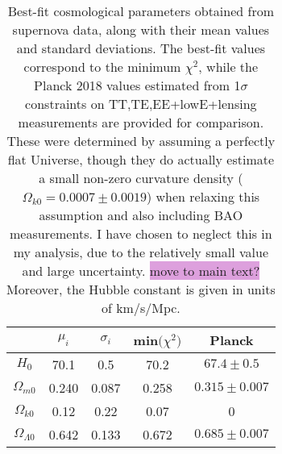 \documentclass{aa}
\numberwithin{equation}{section}
\numberwithin{table}{section}
\numberwithin{figure}{section}
\begin{document}
\begin{table}
  \caption{Best-fit cosmological parameters obtained from supernova data, along with their mean values and standard deviations. The best-fit values correspond to the minimum $\chi^2$, while the Planck 2018 values estimated from 1$\sigma$ constraints on TT,TE,EE+lowE+lensing measurements are provided for comparison. These were determined by assuming a perfectly flat Universe, though they do actually estimate a small non-zero curvature density ($\Omega_{k0}=0.0007\pm0.0019$) when relaxing this assumption and also including BAO measurements. I have chosen to neglect this in my analysis, due to the relatively small value and large uncertainty. \colorbox{Plum}{move to main text?} Moreover, the Hubble constant is given in units of km/s/Mpc.}             %
  \label{table:supernova}      %
  \centering                          %
  \begin{tabular}{| c || c | c | c | c |}        %
  \hline                %
   & \hspace{5pt}$\mu_i$\hspace{5pt} & \hspace{7pt}$\sigma_i$\hspace{7pt} & min$\big(\chi^2\big)$ & Planck \\    %
  \hline\hline                     %
  $H_0$ & \hspace{-10pt}70.1 & \hspace{-10.2pt}0.5 & \hspace{-10.8pt}70.2 & \hspace{-5.5pt}$67.4\pm0.5$ \\
  \hline
  $\Omega_{m0}$ & \hspace{4.8pt}0.240 & \hspace{-0.2pt}0.087 & \hspace{4.6pt}0.258 & $0.315\pm0.007$ \\
  \hline
  $\Omega_{k0}$ & \hspace{0pt}0.12 & \hspace{-5pt}0.22 & \hspace{0pt}0.07 & 0 \\
  \hline
  $\Omega_{\Lambda0}$ & \hspace{5pt}0.642 & 0.133 & \hspace{5pt}0.672 & $0.685\pm0.007$ \\
  \hline                                   %
  \end{tabular}
\end{table}
\end{document}
